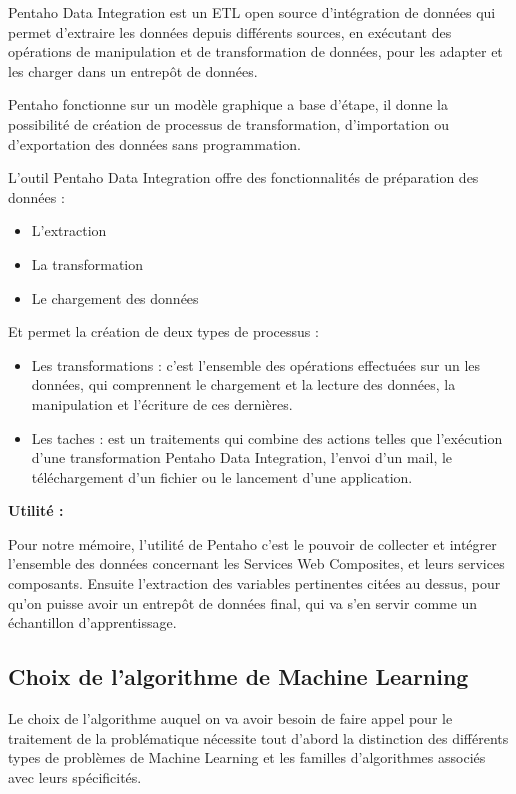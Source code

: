Pentaho Data Integration est un ETL open source d'intégration de données qui permet d'extraire les données depuis différents sources, en exécutant des opérations de manipulation et de transformation de données, pour les adapter et les charger dans un entrepôt de données.

Pentaho fonctionne sur un modèle graphique a base d'étape, il donne la possibilité de création de processus de transformation, d'importation ou d'exportation des données sans programmation.

L'outil Pentaho Data Integration offre des fonctionnalités de préparation des données : 

\begin{itemize}
    \item L'extraction
    \item La transformation 
    \item Le chargement des données 
\end{itemize}

Et permet la création de deux types de processus : 

\begin{itemize}
    \item Les transformations : c'est l'ensemble des opérations effectuées sur un les données, qui comprennent le chargement et la lecture des données, la manipulation et l'écriture de ces dernières.
    
    \item Les taches :  est un traitements qui combine des actions telles que l'exécution d'une transformation Pentaho Data Integration, l'envoi d'un mail, le téléchargement d'un fichier ou le lancement d'une application.
    
\end{itemize}

\textbf{Utilité :}

Pour notre mémoire, l'utilité de Pentaho c'est le pouvoir de collecter et intégrer l'ensemble des données concernant les Services Web Composites, et leurs services composants. Ensuite l'extraction des variables pertinentes citées au dessus, pour qu'on puisse avoir un entrepôt de données final, qui va s'en servir comme un échantillon d'apprentissage.


\subsection{Choix de l'algorithme de Machine Learning}

Le choix de l'algorithme auquel  on va avoir besoin de faire appel pour le traitement de la problématique nécessite tout d'abord  la distinction des différents types de problèmes de Machine Learning et les familles d'algorithmes associés avec leurs spécificités.

